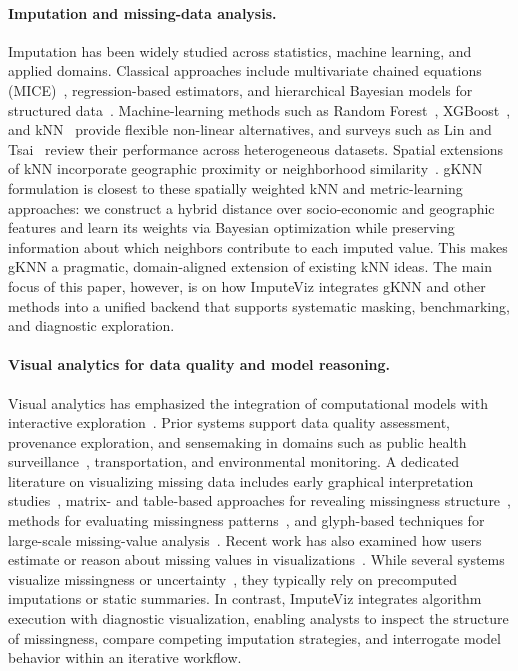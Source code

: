 \documentclass{egpubl}
\newcommand{\gknn}{gKNN\xspace}
\newcommand{\mice}{MICE\xspace}
\newcommand{\tool}{ImputeViz\xspace}
\begin{document}
\paragraph*{Imputation and missing-data analysis.}
Imputation has been widely studied across statistics, machine learning, and applied domains. Classical approaches include multivariate chained equations (\mice)~\cite{VanBuuren2018MICE}, regression-based estimators, and hierarchical Bayesian models for structured data~\cite{Waller2016BayesianSmallArea}. Machine-learning methods such as Random Forest~\cite{Breiman2001RandomForest}, XGBoost~\cite{Chen2016XGBoost}, and kNN~\cite{Cover1967KNN} provide flexible non-linear alternatives, and surveys such as Lin and Tsai~\cite{lin2020missing} review their performance across heterogeneous datasets. Spatial extensions of kNN incorporate geographic proximity or neighborhood similarity~\cite{baker2014missing}. \gknn formulation is closest to these spatially weighted kNN and metric-learning approaches: we construct a hybrid distance over socio-economic and geographic features and learn its weights via Bayesian optimization \cite{snoek2012practical} while preserving information about which neighbors contribute to each imputed value. This makes gKNN a pragmatic, domain-aligned extension of existing kNN ideas. The main focus of this paper, however, is on how ImputeViz integrates gKNN and other methods into a unified backend that supports systematic masking, benchmarking, and diagnostic exploration.

\paragraph*{Visual analytics for data quality and model reasoning.}
Visual analytics has emphasized the integration of computational models with interactive exploration~\cite{Endert2017}. Prior systems support data quality assessment, provenance exploration, and sensemaking in domains such as public health surveillance~\cite{sankaran2016opioid, Carroll2014HealthVis}, transportation, and environmental monitoring. A dedicated literature on visualizing missing data includes early graphical interpretation studies~\cite{eaton2005visualizing}, matrix- and table-based approaches for revealing missingness structure~\cite{fernstad2014visual}, methods for evaluating missingness patterns~\cite{fernstad2019identify}, and glyph-based techniques for large-scale missing-value analysis~\cite{fernstad2021explore}. Recent work has also examined how users estimate or reason about missing values in visualizations~\cite{sun2024investigating}. While several systems visualize missingness or uncertainty~\cite{Sacha2016UncertaintyTrust}, they typically rely on precomputed imputations or static summaries. In contrast, \tool integrates algorithm execution with diagnostic visualization, enabling analysts to inspect the structure of missingness, compare competing imputation strategies, and interrogate model behavior within an iterative workflow.
\end{document}
